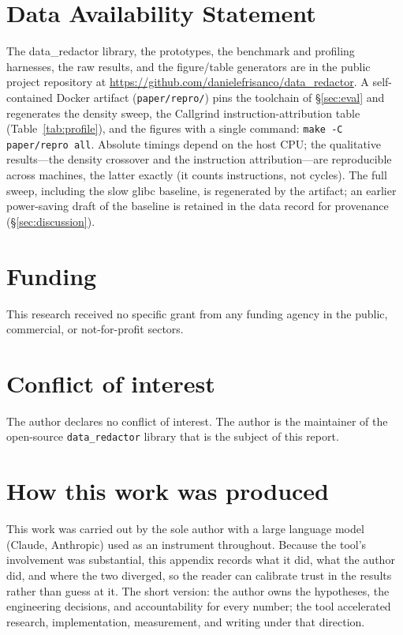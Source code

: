 \documentclass[acmsmall,nonacm,screen]{acmart}
\begin{document}
\section*{Data Availability Statement}
The data\_redactor library, the prototypes, the benchmark and profiling harnesses,
the raw results, and the figure/table generators are in the public project
repository at \url{https://github.com/danielefrisanco/data_redactor}. A
self-contained Docker artifact
(\texttt{paper/repro/}) pins the toolchain of \S\ref{sec:eval} and regenerates the
density sweep, the Callgrind instruction-attribution table (Table~\ref{tab:profile}),
and the figures with a single command: \texttt{make -C paper/repro all}. Absolute
timings depend on the host CPU; the qualitative results---the density crossover and
the instruction attribution---are reproducible across machines, the latter exactly
(it counts instructions, not cycles). The full sweep, including the slow glibc
baseline, is regenerated by the artifact; an earlier power-saving draft of the
baseline is retained in the data record for provenance (\S\ref{sec:discussion}).

\section*{Funding}
This research received no specific grant from any funding agency in the public,
commercial, or not-for-profit sectors.

\section*{Conflict of interest}
The author declares no conflict of interest. The author is the maintainer of the
open-source \texttt{data\_redactor} library that is the subject of this report.

\appendix

\section{How this work was produced}
\label{app:method}

This work was carried out by the sole author with a large language model (Claude,
Anthropic) used as an instrument throughout. Because the tool's involvement was
substantial, this appendix records what it did, what the author did, and where the
two diverged, so the reader can calibrate trust in the results rather than guess at
it. The short version: the author owns the hypotheses, the engineering decisions,
and accountability for every number; the tool accelerated research, implementation,
measurement, and writing under that direction.
\end{document}
